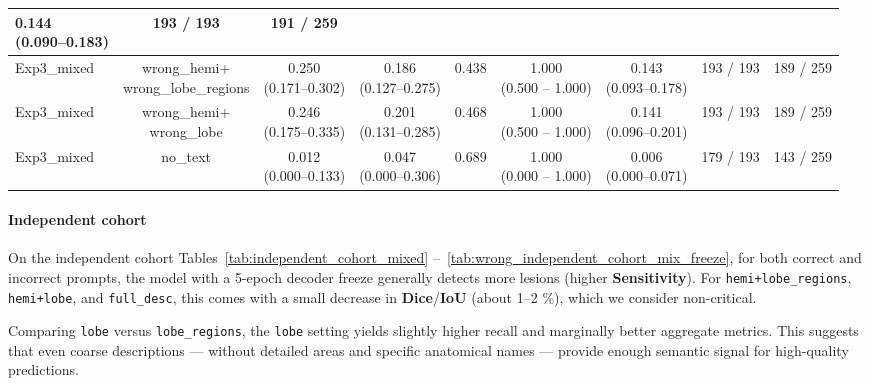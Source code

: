 \documentclass[a4paper,12pt]{article}
\begin{document}
\begin{table}[h]
\begin{tabular}{lcccccccc}
\makecell{\colorbox{green!20}{0.144} \\ (0.090--0.183)} &
193 / 193 &
\colorbox{green!20}{191 / 259} \\
\hline
Exp3\_mixed &
\makecell{wrong\_hemi+\\wrong\_lobe\_regions} &
\makecell{\colorbox{blue!20}{0.250} \\ (0.171--0.302)} &
\makecell{0.186 \\ (0.127--0.275)} &
0.438 &
\makecell{1.000 \\ (0.500 -- 1.000)} &
\makecell{\colorbox{blue!20}{0.143} \\ (0.093--0.178)} &
193 / 193 &
\colorbox{blue!20}{189 / 259} \\
\hline
Exp3\_mixed &
\makecell{wrong\_hemi+\\wrong\_lobe} &
\makecell{\colorbox{orange!20}{0.246} \\ (0.175--0.335)} &
\makecell{\colorbox{blue!20}{0.201} \\ (0.131--0.285)} &
0.468 &
\makecell{1.000 \\ (0.500 -- 1.000)} &
\makecell{\colorbox{orange!20}{0.141} \\ (0.096--0.201)} &
193 / 193 &
\colorbox{blue!20}{189 / 259} \\
\hline
Exp3\_mixed & 
no\_text &
\makecell{0.012 \\ (0.000--0.133)} &
\makecell{0.047 \\ (0.000--0.306)} &
\colorbox{blue!20}{0.689} &
\makecell{1.000 \\ (0.000 -- 1.000)} &
\makecell{0.006 \\ (0.000--0.071)} &
179 / 193 &
143 / 259 \\
\hline
\end{tabular}
\end{table}

\paragraph{Independent cohort}
On the independent cohort Tables~\ref{tab:independent_cohort_mixed} --~\ref{tab:wrong_independent_cohort_mix_freeze}, for both correct and incorrect prompts, the model with a 5-epoch decoder freeze generally detects more lesions (higher \textbf{Sensitivity}). 
For \texttt{hemi+lobe\_regions}, \texttt{hemi+lobe}, and \texttt{full\_desc}, this comes with a small decrease in \textbf{Dice}/\textbf{IoU} (about 1--2 \%), which we consider non-critical.

Comparing \texttt{lobe} versus \texttt{lobe\_regions}, the \texttt{lobe} setting yields slightly higher recall and marginally better aggregate metrics. 
This suggests that even coarse descriptions --- without detailed areas and specific anatomical names --- provide enough semantic signal for high-quality predictions.
\end{document}
